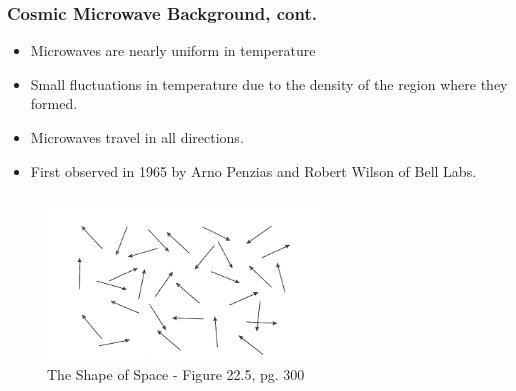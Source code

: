 \documentclass[13pt]{beamer}
\begin{document}
\begin{frame}
\frametitle{Cosmic Microwave Background, cont.}
  \begin{itemize}
    \item Microwaves are nearly uniform in temperature
    \item Small fluctuations in temperature due to the density of the region where they formed.
    \item Microwaves travel in all directions.
    \item First observed in 1965 by Arno Penzias and Robert Wilson of Bell Labs.
  \end{itemize}

    \begin{columns}[c] %
     \centering
      \begin{figure}
        \includegraphics[height=4cm]{./img/cmbwaves} %
        \caption{The Shape of Space - Figure 22.5, pg. 300}
      \end{figure}
  \end{columns}

\end{frame}
\end{document}
